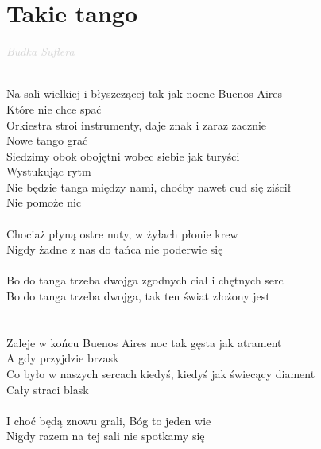 \documentclass[a5paper, 10pt]{book}
\begin{document}
\section{Takie tango}\textcolor{lightgray}{\textit{Budka Suflera}}\\~\\
\begin{minipage}[t]{0.8\textwidth}
  Na sali wielkiej i błyszczącej tak jak nocne Buenos Aires\\
  Które nie chce spać \\
  Orkiestra stroi instrumenty, daje znak i zaraz zacznie\\
  Nowe tango grać\\
  Siedzimy obok obojętni wobec siebie jak turyści\\
  Wystukując rytm\\
  Nie będzie tanga między nami, choćby nawet cud się ziścił\\
  Nie pomoże nic\\
  \\
  \hspace*{3mm}Chociaż płyną ostre nuty, w żyłach płonie krew \\
  \hspace*{3mm}Nigdy żadne z nas do tańca nie poderwie się\\
  \\
  \hspace*{6mm}Bo do tanga trzeba dwojga zgodnych ciał i chętnych serc\\
  \hspace*{6mm}Bo do tanga trzeba dwojga, tak ten świat złożony jest\\
  \\
  \\
  Zaleje w końcu Buenos Aires noc tak gęsta jak atrament\\
  A gdy przyjdzie brzask\\
  Co było w naszych sercach kiedyś, kiedyś jak świecący diament\\
  Cały straci blask\\
  \\
  \hspace*{3mm}I choć będą znowu grali, Bóg to jeden wie\\
  \hspace*{3mm}Nigdy razem na tej sali nie spotkamy się\\
\end{minipage}
\end{document}
